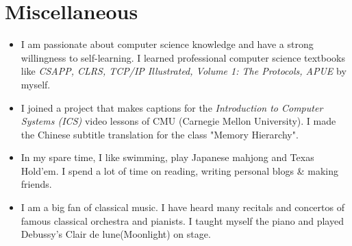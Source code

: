 \documentclass{resume}
\begin{document}
\section{Miscellaneous}
\begin{itemize}[parsep=0.5ex]
  \item I am passionate about computer science knowledge and have a strong willingness to self-learning. I learned professional computer science textbooks like \textit{CSAPP, CLRS, TCP/IP Illustrated, Volume 1: The Protocols, APUE} by myself.
  \item I joined a project that makes captions for the \textit{Introduction to Computer Systems (ICS)} video lessons of CMU (Carnegie Mellon University). I made the Chinese subtitle translation for the class "Memory Hierarchy".
  \item In my spare time, I like swimming, play Japanese mahjong and Texas Hold'em. I spend a lot of time on reading, writing personal blogs \& making friends.
  \item I am a big fan of classical music. I have heard many recitals and concertos of famous classical orchestra and pianists. I taught myself the piano and played Debussy's Clair de lune(Moonlight) on stage.
\end{itemize}

%
%
\end{document}
